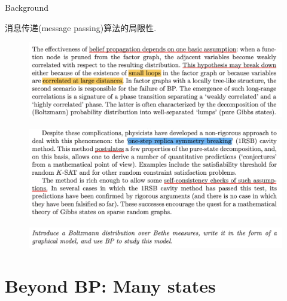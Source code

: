 \documentclass[UTF8]{beamer}
\begin{document}
\begin{frame}{Background}
  \begin{minipage}[c]{0.9\linewidth}
    消息传递(message passing)算法的局限性.
  \end{minipage}
  \vfill
  \begin{minipage}[c]{0.9\linewidth}
    \begin{figure}
      \centering
      \includegraphics[width=0.8\linewidth]{./fig/BP_limitation.png}
    \end{figure}
  \end{minipage}
  \vfill
  \begin{minipage}[c]{0.9\linewidth}
    \begin{figure}
      \centering
      \includegraphics[width=0.8\linewidth]{./fig/1RSB.png}
    \end{figure}
  \end{minipage}
  \vfill
  \begin{minipage}[c]{0.9\linewidth}
    \begin{figure}
      \centering
      \includegraphics[width=0.8\linewidth]{./fig/1RSB_summary.png}
    \end{figure}
  \end{minipage}
\end{frame}


\section{Beyond BP: Many states}
\end{document}
